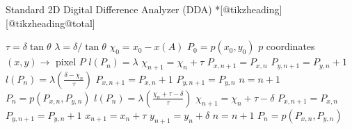 \begin{tcbalgorithm}{Standard 2D Digital Difference Analyzer (DDA)}
        \@premeasure@savebox*[@tikzheading]%
                {\@header@tikzpicture@node{\@header@title@line}}%
                [@tikzheading@total]%
        \begin{algorithmic}[1]%
            \State $\tau=\delta\tan\theta$
            \State $\lambda=\delta / \tan\theta$
            \State $\chi_0=x_0-x(A)$
            \State $P_0=p(x_0,y_0)$%
                \Comment $p$ coordinates $(x,y)\to$  pixel $P$
                    \State $l(P_n)=\lambda$
                    \State $\chi_{n+1}=\chi_n+\tau$
                    \State $P_{x,n+1}=P_{x,n}$
                    \State $P_{y,n+1}=P_{y,n}+1$
                \Else
                    \State $l(P_n)=\lambda\left(\frac{\delta-\chi_n}{\tau}\right)$
                    \State $P_{x,n+1}=P_{x,n}+1$
                    \State $P_{y,n+1}=P_{y,n}$
                    \State $n=n+1$
                    \State $P_{n}=p(P_{x,n},P_{y,n})$
                        \State $l(P_n)=\lambda\left(\frac{\chi_n+\tau-\delta}{\tau}\right)$
                        \State $\chi_{n+1}=\chi_n+\tau-\delta$
                        \State $P_{x,n+1}=P_{x,n}$
                        \State $P_{y,n+1}=P_{y,n}+1$
                    \EndIf
                \EndIf
                \State $x_{n+1}=x_n + \tau$
                \State $y_{n+1}=y_n + \delta$
                \State $n=n+1$
                \State $P_{n}=p(P_{x,n},P_{y,n})$
            \EndWhile
        \EndProcedure
    \end{algorithmic}
\end{tcbalgorithm}
